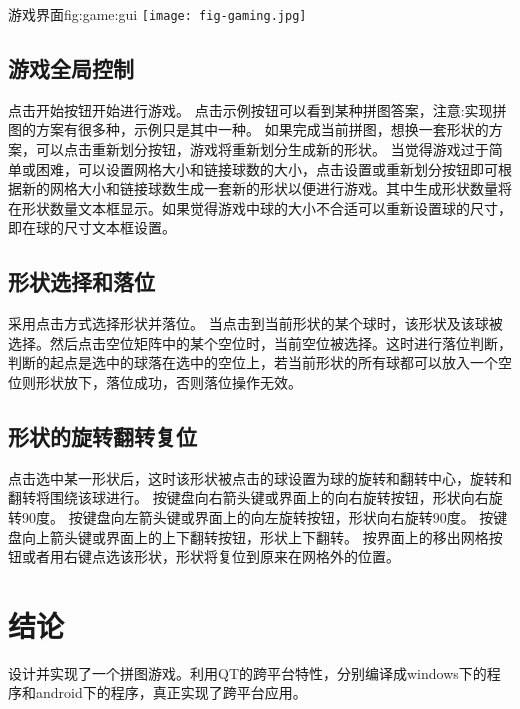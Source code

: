 \documentclass[11pt,twoside]{article} %
\begin{document}
\begin{insertfigure}{游戏界面}{fig:game:gui}{}%
  \centering
  \texttt{[image: fig-gaming.jpg]}
\end{insertfigure}

\subsection{游戏全局控制}
点击开始按钮开始进行游戏。
点击示例按钮可以看到某种拼图答案，注意:实现拼图的方案有很多种，示例只是其中一种。
如果完成当前拼图，想换一套形状的方案，可以点击重新划分按钮，游戏将重新划分生成新的形状。
当觉得游戏过于简单或困难，可以设置网格大小和链接球数的大小，点击设置或重新划分按钮即可根据新的网格大小和链接球数生成一套新的形状以便进行游戏。其中生成形状数量将在形状数量文本框显示。如果觉得游戏中球的大小不合适可以重新设置球的尺寸，即在球的尺寸文本框设置。


\subsection{形状选择和落位}
采用点击方式选择形状并落位。
当点击到当前形状的某个球时，该形状及该球被选择。然后点击空位矩阵中的某个空位时，当前空位被选择。这时进行落位判断，判断的起点是选中的球落在选中的空位上，若当前形状的所有球都可以放入一个空位则形状放下，落位成功，否则落位操作无效。

\subsection{形状的旋转翻转复位}
点击选中某一形状后，这时该形状被点击的球设置为球的旋转和翻转中心，旋转和翻转将围绕该球进行。
按键盘向右箭头键或界面上的向右旋转按钮，形状向右旋转90度。
按键盘向左箭头键或界面上的向左旋转按钮，形状向右旋转90度。
按键盘向上箭头键或界面上的上下翻转按钮，形状上下翻转。
按界面上的移出网格按钮或者用右键点选该形状，形状将复位到原来在网格外的位置。




%
%
\section{结论}
设计并实现了一个拼图游戏。利用QT的跨平台特性，分别编译成windows下的程序和android下的程序，真正实现了跨平台应用。
\end{document}
